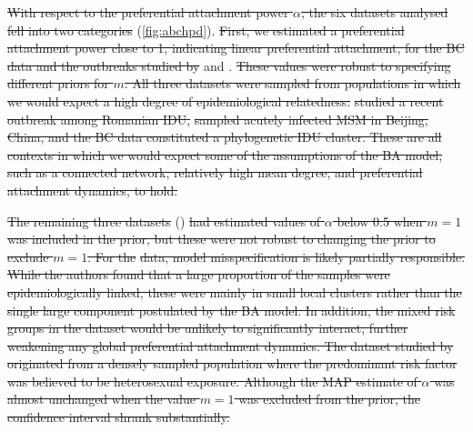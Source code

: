 {\color{red}\sout{With respect to the preferential attachment power $\alpha$,
the six datasets analysed fell into two categories} (\cref{fig:abchpd}).
\sout{First, we estimated a preferential attachment power close to 1,
indicating linear preferential attachment, for the BC data and the outbreaks
studied by} \textcite{niculescu2015recent} and \textcite{wang2015targeting}.
\sout{These values were robust to specifying different priors for $m$. All three
datasets were sampled from populations in which we would expect a high degree
of epidemiological relatedness:} \textcite{niculescu2015recent} \sout{studied a
recent outbreak among Romanian \gls{IDU},} \citeauthor{wang2015targeting}
\sout{sampled acutely infected MSM in Beijing, China, and the BC data
constituted a phylogenetic \gls{IDU} cluster. These are all contexts in which
we would expect some of the assumptions of the BA model, such as a connected
network, relatively high mean degree, and preferential attachment dynamics, to
hold.}

\sout{The remaining three datasets} (\textcite{cuevas2009hiv,
novitsky2014impact, li2015hiv}) \sout{had estimated values of $\alpha$ below
0.5 when $m = 1$ was included in the prior, but these were not robust to
changing the prior to exclude $m = 1$. For the} \citeauthor{cuevas2009hiv} 
\sout{data, model misspecification is likely partially responsible. While the
authors found that a large proportion of the samples were epidemiologically
linked, these were mainly in small local clusters rather than the single large
component postulated by the BA model. In addition, the mixed risk groups in the
dataset would be unlikely to significantly interact, further weakening any
global preferential attachment dynamics. The dataset studied by}
\textcite{novitsky2014impact} \sout{originated from a densely sampled
population where the predominant risk factor was believed to be heterosexual
exposure. Although the MAP estimate of $\alpha$ was almost unchanged when the
value $m = 1$ was excluded from the prior, the confidence interval shrank
substantially.}}



